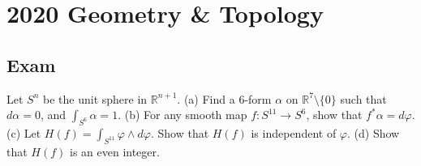 \section{2020 Geometry \& Topology}

\subsection{Exam}

\begin{exercise}
\label{geometry:2020:1}
Let $S^{n}$ be the unit sphere in $\mathbb{R}^{n+1}$.
(a) Find a 6-form $\alpha$ on $\mathbb{R}^{7} \setminus \{0\}$ such that $d\alpha = 0$, and $\int_{S^{6}} \alpha = 1$.
(b) For any smooth map $f : S^{11} \to S^{6}$, show that $f^{*}\alpha = d\varphi$.
(c) Let $H(f) = \int_{S^{11}} \varphi \wedge d\varphi$. Show that $H(f)$ is independent of $\varphi$.
(d) Show that $H(f)$ is an even integer.
\end{exercise}

